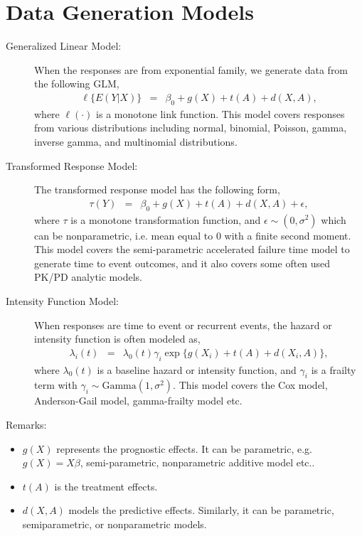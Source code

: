 \documentclass[12pt]{article}
\begin{document}
\section{Data Generation Models} \label{sec.DataGenModels}
\begin{description}
	\item[Generalized Linear Model:] When the responses are from exponential family, we generate data from the following GLM,
	\begin{eqnarray*}
		\ell\{E(Y|X)\} &=& \beta_0 + g(X) + t(A) + d(X,A),
	\end{eqnarray*}
	where $\ell(\cdot)$ is a monotone link function. This model covers responses from various distributions including normal, binomial, Poisson, gamma, inverse gamma, and multinomial distributions.
	\item[Transformed Response Model:] The transformed response model has the following form,
	\begin{eqnarray*}
		\tau(Y) &=& \beta_0 + g(X) + t(A) + d(X,A)+\epsilon,
	\end{eqnarray*}
	where $\tau$ is a monotone transformation function, and $\epsilon \sim (0,\sigma^2)$ which can be nonparametric, i.e. mean equal to 0 with a finite second moment. This model covers the semi-parametric accelerated failure time model to generate time to event outcomes, and it also covers some often used PK/PD analytic models.
	\item[Intensity Function Model:] When responses are time to event or recurrent events, the hazard or intensity function is often modeled as,
	\begin{eqnarray*}
		\lambda_i(t) &=& \lambda_0(t)\gamma_i \exp\{g(X_i)+ t(A)+d(X_i,A)\},
	\end{eqnarray*}
	where $\lambda_0(t)$ is a baseline hazard or intensity function, and $\gamma_i$ is a frailty term with $\gamma_i \sim \mbox{Gamma}(1,\sigma^2)$. This model covers the Cox model, Anderson-Gail model, gamma-frailty model etc.
\end{description}

Remarks:
\begin{itemize}
	\item $g(X)$ represents the prognostic effects. It can be parametric, e.g. $g(X) = X\beta$, semi-parametric, nonparametric additive model etc..
	\item $t(A)$ is the treatment effects.
	\item $d(X,A)$ models the predictive effects. Similarly, it can be parametric, semiparametric, or nonparametric models.
	
\end{itemize}
\end{document}
